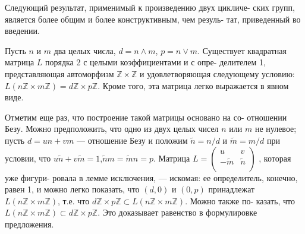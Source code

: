 Следующий результат, применимый к произведению двух цикличе- \linebreak ских групп, является более общим и более конструктивным, чем резуль- \linebreak тат, приведенный во введении.  
\begin{predl}
Пусть $n$ и $m$ два целых числа, $d = n \wedge m$, $p = n \vee m$. Существует \linebreak квадратная матрица $L$ порядка 2 с целыми коэффициентами и с опре- \linebreak делителем 1, представляющая автоморфизм $\mathbb{Z} \times \mathbb{Z}$ и удовлетворяющая \linebreak следующему условию: $L(n\mathbb{Z} \times m\mathbb{Z}) = d\mathbb{Z} \times p\mathbb{Z}$. Кроме того, эта матрица \linebreak легко выражается в явном виде.
\end{predl}
\newpage
\begin{myproof}
Отметим еще раз, что построение такой матрицы основано на со- \linebreak отношении Безу. Можно предположить, что одно из двух целых \linebreak чисел $n$ или $m$ не нулевое; пусть $d = un +vm$ --- отношение Безу \linebreak и положим $\tilde{n} = n/d$ и $\tilde{m} = m/d$ при условии, что $u\tilde{n} + v\tilde{m} = 1$,\linebreak $\tilde{n}m = \tilde{m}n = p$. Матрица $L = {\left( \begin{array}{ccc}
u & v \\
-\tilde{m} & \tilde{n} \\
\end{array} \right)}$ , которая уже фигури- \linebreak ровала в лемме исключения, — искомая: ее определитель, конечно, \linebreak равен 1, и можно легко показать, что $(d, 0)$ и $(0, p)$ принадлежат \linebreak $L(n\mathbb{Z} \times m\mathbb{Z})$, т.е. что $d\mathbb{Z} \times p\mathbb{Z} \subset L(n\mathbb{Z} \times m\mathbb{Z})$. Можно также по- \linebreak казать, что $L(n\mathbb{Z} \times m\mathbb{Z})\subset d\mathbb{Z} \times p\mathbb{Z}$. Это доказывает равенство в \linebreak формулировке предложения.
\end{myproof}
